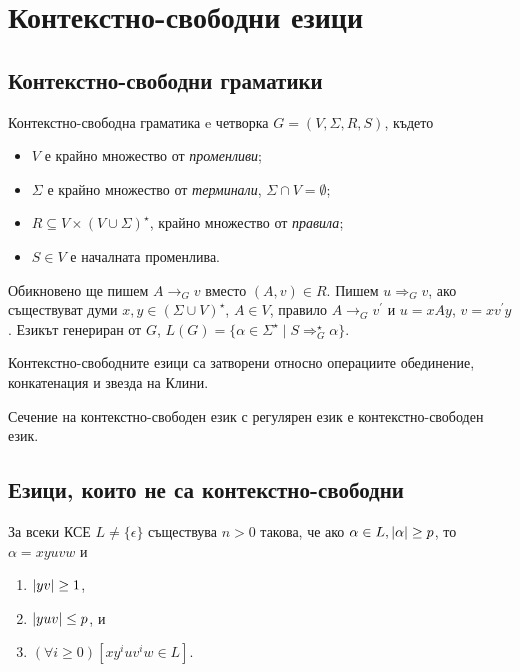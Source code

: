 
\chapter{Контекстно-свободни езици}

\section{Контекстно-свободни граматики}
\begin{dfn}
  Контекстно-свободна граматика e четворка $G = (V,\Sigma,R,S)$,
  където
  \begin{itemize}
  \item
    $V$ е крайно множество от {\em променливи};
  \item
    $\Sigma$ е крайно множество от {\em терминали}, $\Sigma \cap V = \emptyset$;
  \item
    $R \subseteq V\times (V\cup\Sigma)^\star$, крайно множество от {\em правила};
  \item
    $S \in V$ е началната променлива. 
  \end{itemize}
  Обикновено ще пишем $A \rightarrow_G v$ вместо $(A,v) \in R$.
  Пишем $u \Rightarrow_G v$, ако съществуват думи $x,y\in (\Sigma\cup V)^\star$, $A\in V$,
  правило $A\rightarrow_G v^\prime$ и $u = xAy$, $v = xv^\prime y$.
  Езикът генериран от $G$, $L(G) = \{\alpha\in\Sigma^\star\mid S \Rightarrow^\star_G \alpha\}$.
\end{dfn}

\begin{thm}
  Контекстно-свободните езици са затворени относно
  операциите обединение, конкатенация и звезда на Клини.
\end{thm}

\begin{thm}
  Сечение на контекстно-свободен език с регулярен език е контекстно-свободен език.
\end{thm}

\section{Езици, които не са контекстно-свободни}

\begin{lemma}
  \label{lem:pumping-context}
  За всеки КСЕ $L\neq\{\epsilon\}$ съществува $n>0$ такова,
  че ако $\alpha\in L, \vert{\alpha}\vert \geq p$, то $\alpha=xyuvw$ и
  \begin{enumerate}
  \item
    $\vert{yv}\vert\geq 1$,
  \item
    $\vert{yuv}\vert\leq p$, и
  \item
    $(\forall i\geq 0)[xy^iuv^iw\in L]$.
\end{enumerate}
\end{lemma}

